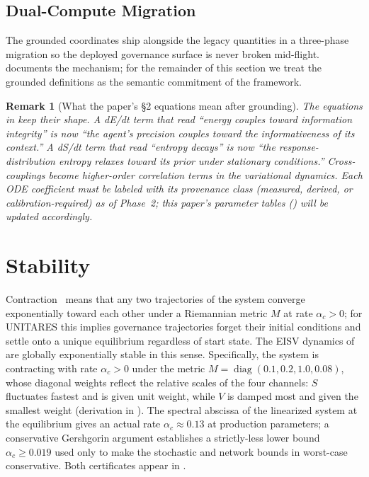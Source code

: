 \documentclass[11pt,twocolumn]{article}
\newtheorem{remark}[theorem]{Remark}
\begin{document}
\subsection{Dual-Compute Migration}

The grounded coordinates ship alongside the legacy quantities in
a three-phase migration so the deployed governance surface is
never broken mid-flight.  documents the
mechanism; for the remainder of this section we treat the
grounded definitions as the semantic commitment of the framework.

\begin{remark}[What the paper's §2 equations mean after grounding]
The equations in  keep their shape. A
dE/dt term that read ``energy couples toward information
integrity'' is now ``the agent's precision couples toward the
informativeness of its context.'' A dS/dt term that read ``entropy
decays'' is now ``the response-distribution entropy relaxes toward
its prior under stationary conditions.'' Cross-couplings become
higher-order correlation terms in the variational dynamics. Each
ODE coefficient must be labeled with its provenance class
(measured, derived, or calibration-required) as of Phase~2; this
paper's parameter tables () will be
updated accordingly.
\end{remark}


\section{Stability}
\label{sec:contraction}

Contraction~\cite{lohmiller1998contraction} means that any two
trajectories of the system converge exponentially toward each
other under a Riemannian metric $M$ at rate $\alpha_c > 0$; for
UNITARES this implies governance trajectories forget their
initial conditions and settle onto a unique equilibrium
regardless of start state. The EISV dynamics of
 are globally exponentially stable in this
sense. Specifically, the system is contracting with rate
$\alpha_c > 0$ under the metric
$M = \operatorname{diag}(0.1, 0.2, 1.0, 0.08)$, whose diagonal
weights reflect the relative scales of the four channels: $S$
fluctuates fastest and is given unit weight, while $V$ is damped
most and given the smallest weight (derivation in
). The spectral abscissa of the
linearized system at the equilibrium gives an actual rate
$\alpha_c \approx 0.13$ at production parameters; a conservative
Gershgorin argument establishes a strictly-less lower bound
$\alpha_c \geq 0.019$ used only to make the stochastic and
network bounds in  worst-case
conservative. Both certificates appear in
.
\end{document}
